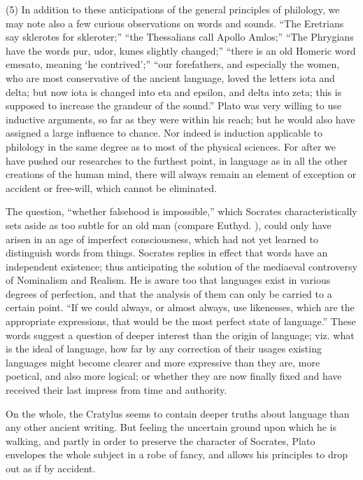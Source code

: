 \documentclass[11pt,letter]{article}
\begin{document}
\par  (5) In addition to these anticipations of the general principles of philology, we may note also a few curious observations on words and sounds. “The Eretrians say sklerotes for skleroter;” “the Thessalians call Apollo Amlos;” “The Phrygians have the words pur, udor, kunes slightly changed;” “there is an old Homeric word emesato, meaning ‘he contrived’;” “our forefathers, and especially the women, who are most conservative of the ancient language, loved the letters iota and delta; but now iota is changed into eta and epsilon, and delta into zeta; this is supposed to increase the grandeur of the sound.” Plato was very willing to use inductive arguments, so far as they were within his reach; but he would also have assigned a large influence to chance. Nor indeed is induction applicable to philology in the same degree as to most of the physical sciences. For after we have pushed our researches to the furthest point, in language as in all the other creations of the human mind, there will always remain an element of exception or accident or free-will, which cannot be eliminated.

\par  The question, “whether falsehood is impossible,” which Socrates characteristically sets aside as too subtle for an old man (compare Euthyd. ), could only have arisen in an age of imperfect consciousness, which had not yet learned to distinguish words from things. Socrates replies in effect that words have an independent existence; thus anticipating the solution of the mediaeval controversy of Nominalism and Realism. He is aware too that languages exist in various degrees of perfection, and that the analysis of them can only be carried to a certain point. “If we could always, or almost always, use likenesses, which are the appropriate expressions, that would be the most perfect state of language.” These words suggest a question of deeper interest than the origin of language; viz. what is the ideal of language, how far by any correction of their usages existing languages might become clearer and more expressive than they are, more poetical, and also more logical; or whether they are now finally fixed and have received their last impress from time and authority.

\par  On the whole, the Cratylus seems to contain deeper truths about language than any other ancient writing. But feeling the uncertain ground upon which he is walking, and partly in order to preserve the character of Socrates, Plato envelopes the whole subject in a robe of fancy, and allows his principles to drop out as if by accident.
\end{document}
